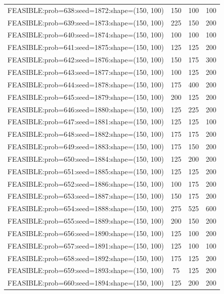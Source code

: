 \begin{longtable}{lccc}
FEASIBLE:prob=638:seed=1872:shape=(150, 100) &      150 &   100 &    100 \\
FEASIBLE:prob=639:seed=1873:shape=(150, 100) &      225 &   150 &    200 \\
FEASIBLE:prob=640:seed=1874:shape=(150, 100) &      100 &   100 &    100 \\
FEASIBLE:prob=641:seed=1875:shape=(150, 100) &      125 &   125 &    200 \\
FEASIBLE:prob=642:seed=1876:shape=(150, 100) &      150 &   175 &    300 \\
FEASIBLE:prob=643:seed=1877:shape=(150, 100) &      100 &   125 &    200 \\
FEASIBLE:prob=644:seed=1878:shape=(150, 100) &      175 &   400 &    200 \\
FEASIBLE:prob=645:seed=1879:shape=(150, 100) &      200 &   125 &    200 \\
FEASIBLE:prob=646:seed=1880:shape=(150, 100) &      125 &   225 &    200 \\
FEASIBLE:prob=647:seed=1881:shape=(150, 100) &      125 &   125 &    100 \\
FEASIBLE:prob=648:seed=1882:shape=(150, 100) &      175 &   175 &    200 \\
FEASIBLE:prob=649:seed=1883:shape=(150, 100) &      175 &   150 &    200 \\
FEASIBLE:prob=650:seed=1884:shape=(150, 100) &      125 &   200 &    200 \\
FEASIBLE:prob=651:seed=1885:shape=(150, 100) &      125 &   125 &    200 \\
FEASIBLE:prob=652:seed=1886:shape=(150, 100) &      100 &   175 &    200 \\
FEASIBLE:prob=653:seed=1887:shape=(150, 100) &      150 &   175 &    200 \\
FEASIBLE:prob=654:seed=1888:shape=(150, 100) &      275 &   525 &    600 \\
FEASIBLE:prob=655:seed=1889:shape=(150, 100) &      200 &   150 &    200 \\
FEASIBLE:prob=656:seed=1890:shape=(150, 100) &      125 &   100 &    200 \\
FEASIBLE:prob=657:seed=1891:shape=(150, 100) &      125 &   100 &    100 \\
FEASIBLE:prob=658:seed=1892:shape=(150, 100) &      175 &   125 &    200 \\
FEASIBLE:prob=659:seed=1893:shape=(150, 100) &       75 &   125 &    200 \\
FEASIBLE:prob=660:seed=1894:shape=(150, 100) &      125 &   200 &    200 \\

\end{longtable}
